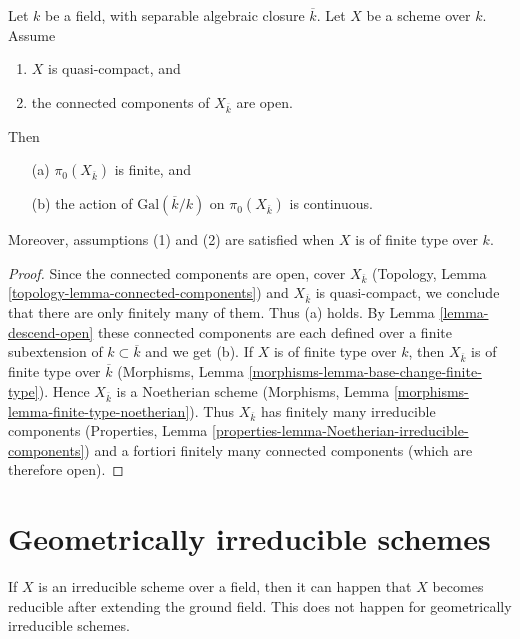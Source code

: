 \begin{lemma}
\label{lemma-galois-action-connected-components-continuous}
Let $k$ be a field, with separable algebraic closure $\overline{k}$.
Let $X$ be a scheme over $k$.
Assume
\begin{enumerate}
\item $X$ is quasi-compact, and
\item the connected components of $X_{\overline{k}}$ are open.
\end{enumerate}
Then
\begin{enumerate}
\item[(a)] $\pi_0(X_{\overline{k}})$ is finite, and
\item[(b)] the action of $\text{Gal}(\overline{k}/k)$ on
$\pi_0(X_{\overline{k}})$ is continuous.
\end{enumerate}
Moreover, assumptions (1) and (2) are satisfied when $X$ is
of finite type over $k$.
\end{lemma}

\begin{proof}
Since the connected components are open, cover $X_{\overline{k}}$
(Topology, Lemma \ref{topology-lemma-connected-components}) and
$X_{\overline{k}}$ is quasi-compact, we conclude that there are only
finitely many of them. Thus (a) holds.
By Lemma \ref{lemma-descend-open} these connected components
are each defined over a finite subextension of $k \subset \overline{k}$
and we get (b).
If $X$ is of finite type over $k$, then $X_{\overline{k}}$ is of finite
type over $\overline{k}$
(Morphisms, Lemma \ref{morphisms-lemma-base-change-finite-type}).
Hence $X_{\overline{k}}$ is a Noetherian scheme
(Morphisms, Lemma \ref{morphisms-lemma-finite-type-noetherian}).
Thus $X_{\overline{k}}$ has finitely many irreducible components
(Properties, Lemma \ref{properties-lemma-Noetherian-irreducible-components})
and a fortiori finitely many connected components (which are
therefore open).
\end{proof}









\section{Geometrically irreducible schemes}
\label{section-geometrically-irreducible}

\noindent
If $X$ is an irreducible scheme over a field, then it can happen that $X$
becomes reducible after extending the ground field. This does not happen
for geometrically irreducible schemes.

